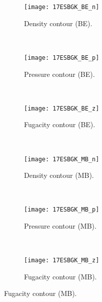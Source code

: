 \documentclass{rsproca}%
\begin{document}
\begin{figure}
        \centering
        \begin{subfigure}[b]{0.32\textwidth}
                \centering
                \texttt{[image: 17ESBGK\_BE\_n]}
                \caption{Density contour (BE).}
                \label{fig:17ESBGK_BE_n}
        \end{subfigure}%
        ~ %
        \begin{subfigure}[b]{0.32\textwidth}
                \centering
                \texttt{[image: 17ESBGK\_BE\_p]}
                \caption{Pressure contour (BE).}
                \label{fig:17ESBGK_BE_p}
        \end{subfigure}
        ~ %
        \begin{subfigure}[b]{0.32\textwidth}
                \centering
                \texttt{[image: 17ESBGK\_BE\_z]}
                \caption{Fugacity contour (BE).}
                \label{fig:17ESBGK_BE_z}
        \end{subfigure}
				~ %
        \begin{subfigure}[b]{0.32\textwidth}
                \centering
                \texttt{[image: 17ESBGK\_MB\_n]}
                \caption{Density contour (MB).}
                \label{fig:17ESBGK_MB_n}
        \end{subfigure}
        ~ %
        \begin{subfigure}[b]{0.32\textwidth}
                \centering
                \texttt{[image: 17ESBGK\_MB\_p]}
                \caption{Pressure contour (MB).}
                \label{fig:17ESBGK_MB_p}
        \end{subfigure}
				~ %
        \begin{subfigure}[b]{0.32\textwidth}
                \centering
                \texttt{[image: 17ESBGK\_MB\_z]}
                \caption{Fugacity contour (MB).}
                \label{fig:17ESBGK_MB_z}

\end{subfigure}
\end{figure}
\end{document}
